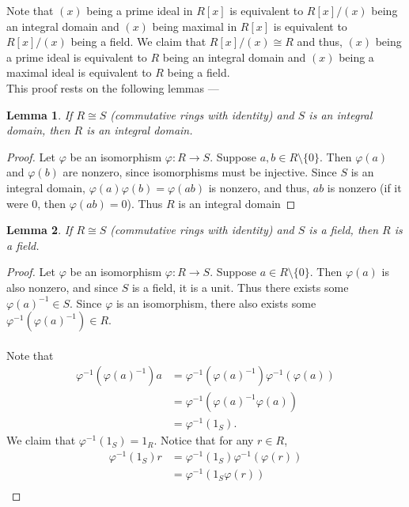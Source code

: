 \documentclass[12 pt, letterpaper]{hmcpset}
\newtheorem*{lemma}{Lemma}
\begin{document}
\begin{solution}
	Note that $(x)$ being a prime ideal in $R[x]$ is equivalent to $R[x]/(x)$ being an integral domain and $(x)$ being maximal in $R[x]$ is equivalent to $R[x]/(x)$ being a field. We claim that $R[x]/(x) \cong R$ and thus, $(x)$ being a prime ideal is equivalent to $R$ being an integral domain and $(x)$ being a maximal ideal is equivalent to $R$ being a field. \\
	
	This proof rests on the following lemmas ---
	\begin{lemma}
		If $R \cong S$ (commutative rings with identity) and $S$ is an integral domain, then $R$ is an integral domain.
	\end{lemma}
	\begin{proof}
		Let $\varphi$ be an isomorphism $\varphi : R \to S$. Suppose $a, b \in R \setminus \{ 0 \}$. Then $\varphi(a)$ and $\varphi(b)$ are nonzero, since isomorphisms must be injective. Since $S$ is an integral domain, $\varphi(a)\varphi(b) = \varphi(ab)$ is nonzero, and thus, $ab$ is nonzero (if it were $0$, then $\varphi(ab) = 0$). Thus $R$ is an integral domain
	\end{proof}
	\begin{lemma}
		If $R \cong S$ (commutative rings with identity) and $S$ is a field, then $R$ is a field.
	\end{lemma}
	\begin{proof}
		Let $\varphi$ be an isomorphism $\varphi : R \to S$. Suppose $a \in R \setminus \{ 0 \}$. Then $\varphi(a)$ is also nonzero, and since $S$ is a field, it is a unit. Thus there exists some $\varphi(a)^{-1} \in S$. Since $\varphi$ is an isomorphism, there also exists some $\varphi^{-1}(\varphi(a)^{-1}) \in R$. \\\\
		Note that
		\[
			\begin{split}
				\varphi^{-1}(\varphi(a)^{-1}) a & = \varphi^{-1}(\varphi(a)^{-1}) \varphi^{-1}(\varphi(a)) \\
								& = \varphi^{-1}(\varphi(a)^{-1} \varphi(a)) \\
								& = \varphi^{-1}(1_{S}).
			\end{split}
		\]
		We claim that $\varphi^{-1}(1_{S}) = 1_{R}$. Notice that for any $r \in R$,
		\[
			\begin{split}
				\varphi^{-1}(1_{S}) r & = \varphi^{-1}(1_{S}) \varphi^{-1}(\varphi(r)) \\
						      & = \varphi^{-1}(1_{S} \varphi(r)) \\

\end{split}\]
\end{proof}
\end{solution}
\end{document}
